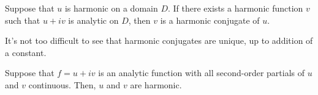\begin{definition}
    Suppose that $u$ is harmonic on a domain $D$. If there exists a harmonic function $v$ such that $u + iv$ is analytic on $D$, then $v$ is a harmonic conjugate of $u$.
\end{definition}

It's not too difficult to see that harmonic conjugates are unique, up to addition of a constant.

\begin{theorem}
    Suppose that $f = u + iv$ is an analytic function with all second-order partials of $u$ and $v$ continuous. Then, $u$ and $v$ are harmonic.
\end{theorem}